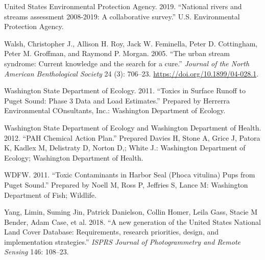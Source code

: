 \documentclass[
]{report}
\begin{document}
\leavevmode\hypertarget{ref-USEPA2019}{}%
United States Environmental Protection Agency. 2019. ``National rivers and streams assessment 2008-2019: A collaborative survey.'' U.S. Environmental Protection Agency.

\leavevmode\hypertarget{ref-Walsh2005}{}%
Walsh, Christopher J., Allison H. Roy, Jack W. Feminella, Peter D. Cottingham, Peter M. Groffman, and Raymond P. Morgan. 2005. ``The urban stream syndrome: Current knowledge and the search for a cure.'' \emph{Journal of the North American Benthological Society} 24 (3): 706--23. \url{https://doi.org/10.1899/04-028.1}.

\leavevmode\hypertarget{ref-WashingtonStateDepartmentofEcology2011}{}%
Washington State Department of Ecology. 2011. ``Toxics in Surface Runoff to Puget Sound: Phase 3 Data and Load Estimates.'' Prepared by Herrerra Environmental COnsultants, Inc.: Washington Department of Ecology.

\leavevmode\hypertarget{ref-WashingtonStateDepartmentofEcologyandWashingtonDepartmentofHealth2012}{}%
Washington State Department of Ecology and Washington Department of Health. 2012. ``PAH Chemical Action Plan.'' Prepared Davies H, Stone A, Grice J, Patora K, Kadlex M, Delistraty D, Norton D,; White J.: Washington Department of Ecology; Washington Department of Health.

\leavevmode\hypertarget{ref-WDFW2011}{}%
WDFW. 2011. ``Toxic Contaminants in Harbor Seal (Phoca vitulina) Pups from Puget Sound.'' Prepared by Noell M, Ross P, Jeffries S, Lance M: Washington Department of Fish; Wildlife.

\leavevmode\hypertarget{ref-yang2018new}{}%
Yang, Limin, Suming Jin, Patrick Danielson, Collin Homer, Leila Gass, Stacie M Bender, Adam Case, et al. 2018. ``A new generation of the United States National Land Cover Database: Requirements, research priorities, design, and implementation strategies.'' \emph{ISPRS Journal of Photogrammetry and Remote Sensing} 146: 108--23.
\end{document}
